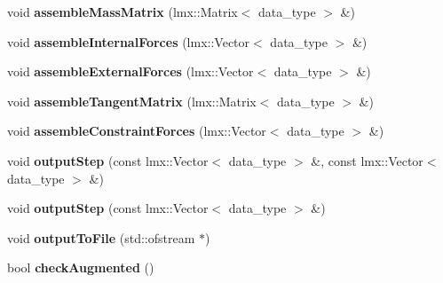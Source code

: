 \begin{CompactItemize}
\item 
\hypertarget{classmknix_1_1System_e7d34bdd8c9c12ba24663f3f2e3ef75c}{
void \textbf{assembleMassMatrix} (lmx::Matrix$<$ data\_\-type $>$ \&)}
\label{classmknix_1_1System_e7d34bdd8c9c12ba24663f3f2e3ef75c}

\item 
\hypertarget{classmknix_1_1System_045a56838910627b66dc981205358b78}{
void \textbf{assembleInternalForces} (lmx::Vector$<$ data\_\-type $>$ \&)}
\label{classmknix_1_1System_045a56838910627b66dc981205358b78}

\item 
\hypertarget{classmknix_1_1System_3f8ef449040805bcc58e3a36a6276888}{
void \textbf{assembleExternalForces} (lmx::Vector$<$ data\_\-type $>$ \&)}
\label{classmknix_1_1System_3f8ef449040805bcc58e3a36a6276888}

\item 
\hypertarget{classmknix_1_1System_4311a423d3a9d7072c0d49031e3bba32}{
void \textbf{assembleTangentMatrix} (lmx::Matrix$<$ data\_\-type $>$ \&)}
\label{classmknix_1_1System_4311a423d3a9d7072c0d49031e3bba32}

\item 
\hypertarget{classmknix_1_1System_24b1a9bcb9279bbb2384d2bbf94b157c}{
void \textbf{assembleConstraintForces} (lmx::Vector$<$ data\_\-type $>$ \&)}
\label{classmknix_1_1System_24b1a9bcb9279bbb2384d2bbf94b157c}

\item 
\hypertarget{classmknix_1_1System_22677dbc55080b00290652416ee8bb90}{
void \textbf{outputStep} (const lmx::Vector$<$ data\_\-type $>$ \&, const lmx::Vector$<$ data\_\-type $>$ \&)}
\label{classmknix_1_1System_22677dbc55080b00290652416ee8bb90}

\item 
\hypertarget{classmknix_1_1System_c161fd48c06a65cfa7b9e27dfbad3f47}{
void \textbf{outputStep} (const lmx::Vector$<$ data\_\-type $>$ \&)}
\label{classmknix_1_1System_c161fd48c06a65cfa7b9e27dfbad3f47}

\item 
\hypertarget{classmknix_1_1System_f08300f28c64abfc4065888a643b4bbf}{
void \textbf{outputToFile} (std::ofstream $\ast$)}
\label{classmknix_1_1System_f08300f28c64abfc4065888a643b4bbf}

\item 
\hypertarget{classmknix_1_1System_477db1887fa5858d2708f50397aa6ebf}{
bool \textbf{checkAugmented} ()}
\label{classmknix_1_1System_477db1887fa5858d2708f50397aa6ebf}


\end{CompactItemize}
